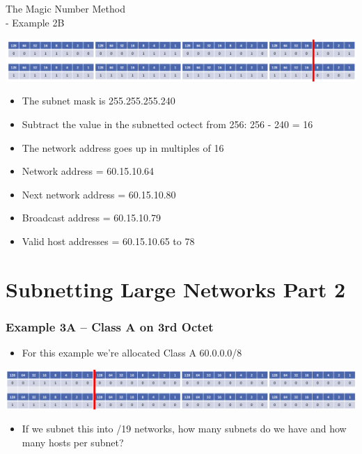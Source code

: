 \documentclass[pdflatex,compress]{beamer}
\begin{document}
\begin{frame}{The Magic Number Method\\ - Example 2B}
	\begin{center}
		\includegraphics[width=\linewidth]{img/img21}
	\end{center}
	\begin{itemize}
		\item The subnet mask is 255.255.255.240
		\item Subtract the value in the subnetted octect from 256: 256 - 240 = 16
		\item The network address goes up in multiples of 16
		\item Network address = 60.15.10.64
		\item Next network address = 60.15.10.80
		\item Broadcast address = 60.15.10.79
		\item Valid host addresses = 60.15.10.65 to 78
	\end{itemize}
\end{frame}

\section{Subnetting Large Networks Part 2}

\begin{frame}
	\frametitle{Example 3A – Class A on 3rd Octet}
	\begin{itemize}
		\item For this example we’re allocated Class A 60.0.0.0/8
	\end{itemize}
	\begin{center}
		\includegraphics[width=\linewidth]{img/img22}
	\end{center}
	\begin{itemize}
		\item If we subnet this into /19 networks, how many subnets do we have and how many hosts per subnet?
	\end{itemize}
\end{frame}
\end{document}
